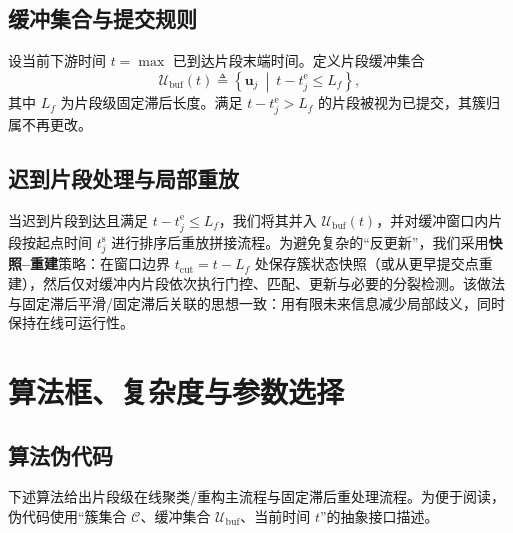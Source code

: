 \documentclass{xdupgthesis}
\begin{document}
\subsection{缓冲集合与提交规则}
设当前下游时间 $t=\max$ 已到达片段末端时间。定义片段缓冲集合
\begin{equation}
	\mathcal{U}_{\mathrm{buf}}(t)\triangleq
	\left\{
	\mathbf{u}_j\ \middle|\ t-t_j^{\mathrm{e}}\le L_f
	\right\},
	\tag{4-41}
\end{equation}
其中 $L_f$ 为片段级固定滞后长度。满足 $t-t_j^{\mathrm{e}}>L_f$ 的片段被视为已提交，其簇归属不再更改。

\subsection{迟到片段处理与局部重放}
当迟到片段到达且满足 $t-t_j^{\mathrm{e}}\le L_f$，我们将其并入 $\mathcal{U}_{\mathrm{buf}}(t)$，并对缓冲窗口内片段按起点时间 $t_j^{\mathrm{s}}$ 进行排序后重放拼接流程。为避免复杂的“反更新”，我们采用\textbf{快照--重建}策略：在窗口边界 $t_{\mathrm{cut}}=t-L_f$ 处保存簇状态快照（或从更早提交点重建），然后仅对缓冲内片段依次执行门控、匹配、更新与必要的分裂检测。该做法与固定滞后平滑/固定滞后关联的思想一致：用有限未来信息减少局部歧义，同时保持在线可运行性。

\section{算法框、复杂度与参数选择}
\subsection{算法伪代码}
下述算法给出片段级在线聚类/重构主流程与固定滞后重处理流程。为便于阅读，伪代码使用“簇集合 $\mathcal{C}$、缓冲集合 $\mathcal{U}_{\mathrm{buf}}$、当前时间 $t$”的抽象接口描述。
\end{document}
